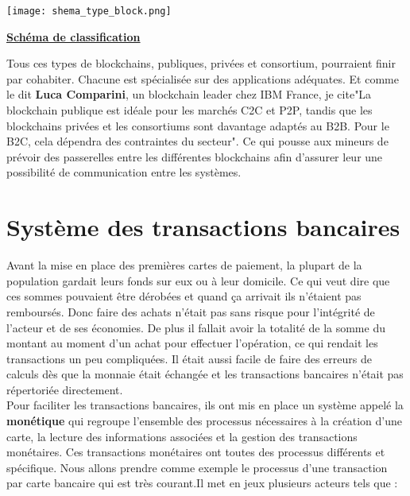 \documentclass[12pt]{report}
\begin{document}
\begin{center}
    \texttt{[image: shema\_type\_block.png]}

    \textbf{\underline{Schéma de classification}} \\[1cm]
\end{center}

\hspace{1cm} Tous ces types de blockchains, publiques, privées et consortium, pourraient finir par cohabiter. Chacune est spécialisée sur des applications adéquates. Et comme le dit  \textbf{Luca Comparini}, un blockchain leader chez IBM France, je cite"La blockchain publique est idéale pour les marchés C2C et P2P, tandis que les blockchains privées et les consortiums sont davantage adaptés au B2B. Pour le B2C, cela dépendra des contraintes du secteur".  Ce qui pousse aux mineurs de prévoir des passerelles entre les différentes blockchains afin d'assurer leur une possibilité de communication entre les systèmes.\\


\newpage
\section{Système des transactions bancaires}

\hspace{1cm} Avant la mise en place des premières cartes de paiement, la plupart de la population gardait leurs fonds sur eux ou à leur domicile. Ce qui veut dire que ces sommes pouvaient être dérobées et quand ça arrivait ils n'étaient pas remboursés. Donc faire des achats n'était pas sans risque pour l'intégrité de l'acteur et de ses économies. De plus il fallait avoir la totalité de la somme du montant au moment d'un achat pour effectuer l'opération, ce qui rendait les transactions un peu compliquées. Il était aussi facile de faire des erreurs de calculs dès que la monnaie était échangée et les transactions bancaires n'était pas répertoriée directement.\\

\hspace{1cm} Pour faciliter les transactions bancaires, ils ont mis en place un système appelé la \textbf{monétique} qui regroupe l'ensemble des processus nécessaires à la création d'une carte, la lecture des informations associées et la gestion des transactions monétaires. Ces transactions monétaires ont toutes des processus différents et spécifique. Nous allons prendre comme exemple le processus d'une transaction par carte bancaire qui est très courant.Il met en jeux plusieurs acteurs tels que : 
\end{document}
